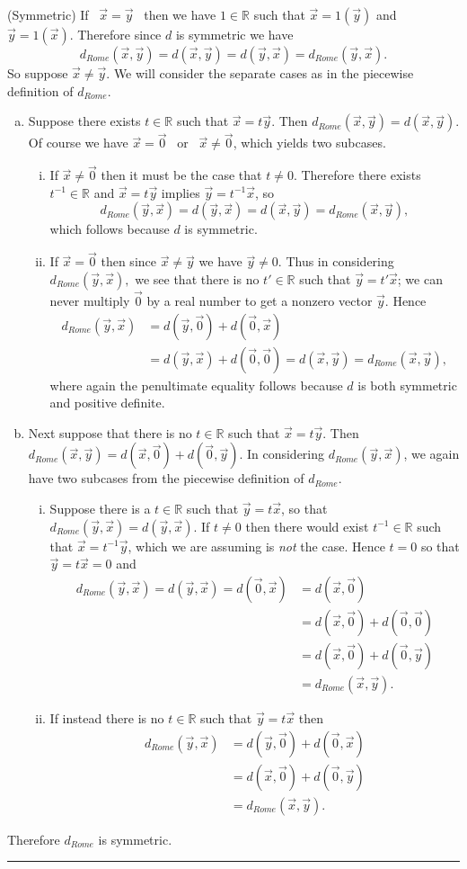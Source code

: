 \documentclass[12pt]{article}
\newcommand{\R}{\mathbb R} %
\newcommand{\dr}{d_{Rome}}
\newcommand{\x}{\vec{x}}
\newcommand{\y}{\vec{y}}
\newcommand{\vz}{\vec{0}}
\newenvironment{proof}{\noindent {\bf Proof: }}{\hfill
\rule{1mm}{3mm} \bigskip}
\begin{document}
\begin{proof}
\noindent(Symmetric) If \ $\x=\y$ \ then we have $1\in\R$ such that $\x=1(\y)$ and $\y=1(\x)$. Therefore since $d$ is symmetric we have $$\dr(\x,\y)=d(\x,\y) = d(\y,\x) =\dr(\y,\x).$$ So suppose $\x\ne\y$. We will consider the separate cases as in the piecewise definition of $\dr$. 
\begin{enumerate}[(a)]
\item{Suppose there exists $t\in\R$ such that $\x=t\y$. Then $\dr(\x,\y)=d(\x,\y).$ Of course we have $\x=\vz$ \ or \ $\x\ne\vz$, which yields two subcases.}
\begin{enumerate}[(i)]
\item{If $\x\ne\vz$ then it must be the case that $t\ne0$. Therefore there exists $t^{-1}\in\R$ and $\x=t\y$ implies $\y=t^{-1}\x$, so $$\dr(\y,\x)=d(\y,\x)=d(\x,\y)=\dr(\x,\y),$$ which follows because $d$ is symmetric.}
\item{If $\x=\vz$ then since $\x\ne\y$ we have $\y\ne0$. Thus in considering $\dr(\y,\x),$ we see that there is no $t' \in \R$ such that $\y = t' \x$; we can never multiply $\vz$ by a real number to get a nonzero vector $\y$. Hence 
\begin{align*} \dr(\y,\x)&=d(\y,\vz) + d(\vz, \x)\\
				&= d(\y, \x) + d( \vz, \vz) = d(\x,\y) = \dr(\x,\y),
\end{align*}}
where again the penultimate equality follows because $d$ is both symmetric and positive definite.
\end{enumerate}
\item{Next suppose that there is no $t\in\R$ such that $\x=t\y$. Then $\dr(\x,\y)=d(\x,\vz)+d(\vz,\y).$ In considering $\dr(\y,\x)$, we again have two subcases from the piecewise definition of $\dr$.
\begin{enumerate}[(i)]
\item{Suppose there is a $t\in\R$ such that $\y=t\x$, so that $\dr(\y,\x)=d(\y,\x)$. If $t\ne0$ then there would exist $t^{-1}\in\R$ such that $\x=t^{-1}\y$, which we are assuming is {\em not} the case. Hence $t=0$ so that $\y = t\x = 0$ and
\begin{align*} \dr(\y,\x) = d(\y,\x) = d(\vz, \x) &= d(\x, \vz)\\
								&=d(\x,\vz) + d(\vz, \vz)\\
								&=d(\x,\vz) + d(\vz, \y)\\
								&=\dr(\x,\y).
\end{align*}}
\item{If instead there is no $t\in\R$ such that $\y=t\x$ then 
\begin{align*}
\dr(\y,\x)&=d(\y,\vz) + d(\vz, \x)\\
		&= d(\x, \vz) + d(\vz, \y)\\
		&= \dr(\x,\y).
\end{align*}}
\end{enumerate}}
\end{enumerate}
Therefore  $\dr$ is symmetric.\\


\end{proof}
\end{document}
